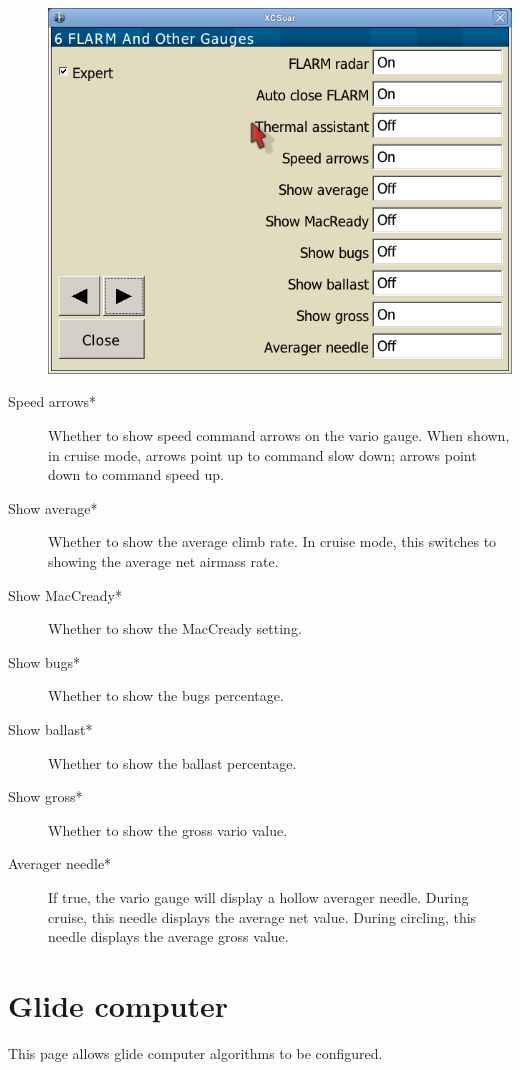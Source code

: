\begin{description}
\begin{center}
\includegraphics[angle=0,width=0.8\linewidth,keepaspectratio='true']{figures/config-othergauges.png}
\end{center}
\label{conf:variogauge}
\item[Speed arrows*]  \label{conf:variogauge} Whether to show speed command 
  arrows on the vario gauge.
  When shown, in cruise mode, arrows point up to command slow down; arrows point down 
  to command speed up.
\item[Show average*]  Whether to show the average climb rate.  In cruise mode, this 
  switches to showing the average net airmass rate.
\item[Show MacCready*]  Whether to show the MacCready setting.
\item[Show bugs*]  Whether to show the bugs percentage.
\item[Show ballast*]  Whether to show the ballast percentage.
\item[Show gross*]  Whether to show the gross vario value.
\item[Averager needle*]  If true, the vario gauge will display a hollow averager
  needle. During cruise, this needle displays the average net value. During circling, 
  this needle displays the average gross value.
\end{description}


\clearpage
\section{Glide computer}\label{sec:final-glide}

This page allows glide computer algorithms to be configured.

